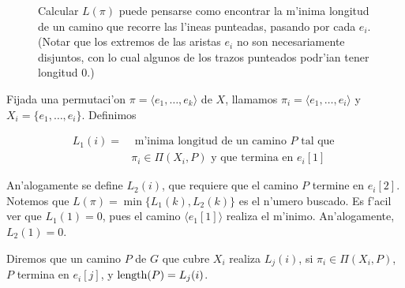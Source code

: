 \begin{figure}[h]
	\begin{center}
		
	\end{center}		
	\caption{Calcular $L(\pi)$ puede pensarse como encontrar la m'inima longitud de un camino que recorre las l'ineas punteadas, pasando por cada $e_i$. (Notar que los extremos de las aristas $e_i$ no son necesariamente disjuntos, con lo cual algunos de los trazos punteados podr'ian tener longitud $0$.)}
	\label{fig:exactos_5}
\end{figure}

Fijada una permutaci'on $\pi = \langle e_1, \dots, e_k \rangle$ de $X$, llamamos $\pi_i = \langle e_1, \dots, e_i \rangle$ y $X_i = \{e_1, \dots, e_i\}$. Definimos

\begin{align*}
L_1(i) =& \text{ m'inima longitud de un camino } P \text{ tal que }\\
&\pi_i \in \Pi(X_i, P) \text{ y que termina en } e_{i}[1]
\end{align*}

\noindent
An'alogamente se define $L_2(i)$, que requiere que el camino $P$ termine en $e_{i}[2]$. Notemos que $L(\pi) = \min\{L_1(k), L_2(k)\}$ es el n'umero buscado. Es f'acil ver que $L_1(1) = 0$, pues el camino $\langle e_{1}[1] \rangle$ realiza el m'inimo. An'alogamente, $L_2(1) = 0$.

Diremos que un camino $P$ de $G$ que cubre $X_i$ realiza $L_j(i)$, si $\pi_i \in \Pi(X_i, P)$, $P$ termina en $e_{i}[j]$, y $\textnormal{length}(P) = L_j(i)$.

